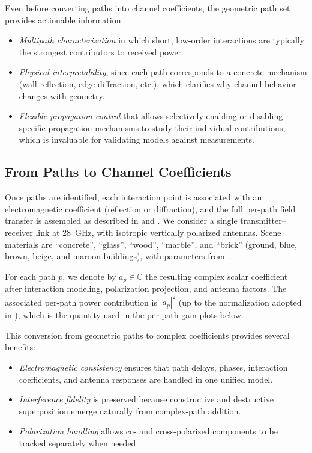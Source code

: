 Even before converting paths into channel coefficients, the geometric path set provides actionable information:
\begin{itemize}
  \item \emph{Multipath characterization} in which short, low-order interactions are typically the strongest contributors to received power.
  \item \emph{Physical interpretability}, since each path corresponds to a concrete mechanism (wall reflection, edge diffraction, etc.), which clarifies why channel behavior changes with geometry.
  \item \emph{Flexible propagation control} that allows selectively enabling or disabling specific propagation mechanisms to study their individual contributions, which is invaluable for validating models against measurements.
\end{itemize}

\subsection{From Paths to Channel Coefficients}

Once paths are identified, each interaction point is associated with an electromagnetic coefficient (reflection or diffraction), and the full per-path field transfer is assembled as described in  and . We consider a single transmitter--receiver link at \qty{28}{\giga\hertz}, with isotropic vertically polarized antennas. Scene materials are \enquote{concrete}, \enquote{glass}, \enquote{wood}, \enquote{marble}, and \enquote{brick} (ground, blue, brown, beige, and maroon buildings), with parameters from~.

For each path $p$, we denote by $a_p \in \mathbb{C}$ the resulting complex scalar coefficient after interaction modeling, polarization projection, and antenna factors. The associated per-path power contribution is $|a_p|^2$ (up to the normalization adopted in ), which is the quantity used in the per-path gain plots below.

This conversion from geometric paths to complex coefficients provides several benefits:
\begin{itemize}
  \item \emph{Electromagnetic consistency} ensures that path delays, phases, interaction coefficients, and antenna responses are handled in one unified model.
  \item \emph{Interference fidelity} is preserved because constructive and destructive superposition emerge naturally from complex-path addition.
  \item \emph{Polarization handling} allows co- and cross-polarized components to be tracked separately when needed.
\end{itemize}

